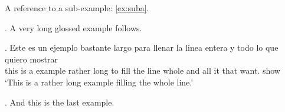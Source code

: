 \documentclass[a4paper]{article}
\begin{document}
A reference to a sub-example: \ref{ex:suba}.

\ex. A very long glossed example follows.

\ex. \gll Este es un ejemplo bastante largo para llenar la linea entera y todo lo que quiero mostrar \\
     this is a example rather long to fill the line whole and all it that want. show \\
\glt `This is a rather long example filling the whole line.'

\ex.\label{ex:last} And this is the last example.
\end{document}
